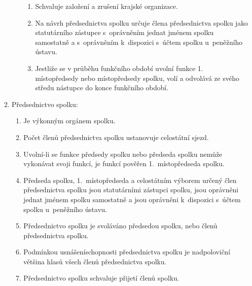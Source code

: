 \documentclass[a4paper]{article}
\begin{document}
\begin{enumerate}
\begin{enumerate}
\begin{enumerate}
            \item Schvaluje založení a zrušení krajské organizace.

            \item Na návrh předsednictva spolku určuje člena
                předsednictva spolku jako statutárního zástupce 
                s~oprávněním jednat jménem spolku samostatně a
                s~oprávněním k~dispozici s~účtem spolku
                u~peněžního ústavu.

            \item Jestliže se v průběhu funkčního období uvolní
                funkce 1. místopředsedy nebo místopředsedy spolku,
                volí a odvolává ze svého středu nástupce do konce
                funkčního období.

            \end{enumerate}

        \end{enumerate}

    \item Předsednictvo spolku:
        \begin{enumerate}
        \item Je výkonným orgánem spolku.

        \item Počet členů předsednictva spolku ustanovuje celostátní sjezd.

        \item Uvolní-li se funkce předsedy spolku nebo předseda
            spolku nemůže vykonávat svoji funkcí, je funkcí pověřen
            1.~místopředseda spolku.

        \item Předseda spolku, 1.~místopředseda a celostátním
            výborem určený člen předsednictva spolku jsou
            statutárními zástupci spolku, jsou oprávněni jednat
            jménem spolku samostatně a jsou oprávněni k~dispozici
            s~účtem spolku u~peněžního ústavu.

        \item Předsednictvo spolku je svoláváno předsedou spolku, nebo
             členů předsednictva spolku.

        \item Podmínkou usnášeníschopnosti předsednictva spolku je
            nadpoloviční většina hlasů všech členů předsednictva spolku.

        \item Předsednictvo spolku schvaluje přijetí členů spolku.


\end{enumerate}
\end{enumerate}
\end{document}
